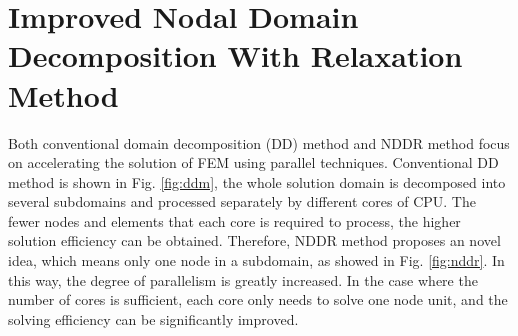 \documentclass[journal,transmag]{IEEEtran}
\begin{document}
\section{Improved Nodal Domain Decomposition With Relaxation Method}
Both conventional domain decomposition (DD) method and NDDR method focus on accelerating the solution of FEM using parallel techniques. Conventional DD method is shown in Fig. \ref{fig:ddm}, the whole solution domain is decomposed into several subdomains and processed separately by different cores of CPU. The fewer nodes and elements that each core is required to process, the higher solution efficiency can be obtained. Therefore, NDDR method proposes an novel idea, which means only one node in a subdomain, as showed in Fig. \ref{fig:nddr}. In this way, the degree of parallelism is greatly increased. In the case where the number of cores is sufficient, each core only needs to solve one node unit, and the solving efficiency can be significantly improved.
\end{document}
